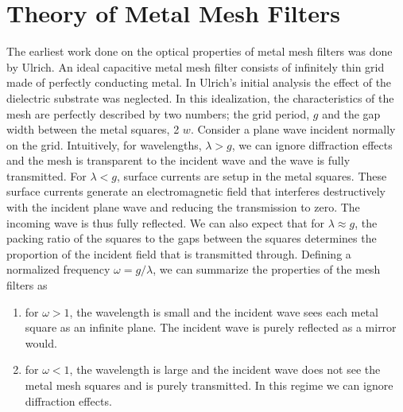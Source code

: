 \documentclass[12pt]{article}
\begin{document}


\section{Theory of Metal Mesh Filters}
   
The earliest work done on the optical properties of metal mesh filters was done by Ulrich. An ideal capacitive metal mesh filter consists of infinitely thin grid made of perfectly conducting metal. In Ulrich's initial analysis the effect of the dielectric substrate was neglected. In this idealization, the characteristics of the mesh are perfectly described by two numbers; the grid period, $g$ and the gap width between the metal squares, 2 $w$. Consider a plane wave incident normally on the grid. Intuitively, for wavelengths, $\lambda > g$, we can ignore diffraction effects and the mesh is transparent to the incident wave and the wave is fully transmitted. For $\lambda < g$, surface currents are setup in the metal squares. These surface currents generate an electromagnetic field that interferes destructively with the incident plane wave and reducing the transmission to zero. The incoming wave is thus fully reflected. We can also expect that for $\lambda \approx g$, the packing ratio of the squares to the gaps between the squares determines the proportion of the incident field that is transmitted through. Defining a normalized frequency $\omega = g/\lambda$, we can summarize the properties of the mesh filters as 

\begin{enumerate}
    \item for $\omega > 1$, the wavelength is small and the incident wave sees each metal square as an infinite plane. The incident wave is purely reflected as a mirror would.
    \item for $\omega < 1$, the wavelength is large and the incident wave does not see the metal mesh squares and is purely transmitted. In this regime we can ignore diffraction effects.
\end{enumerate}  
\end{document}
